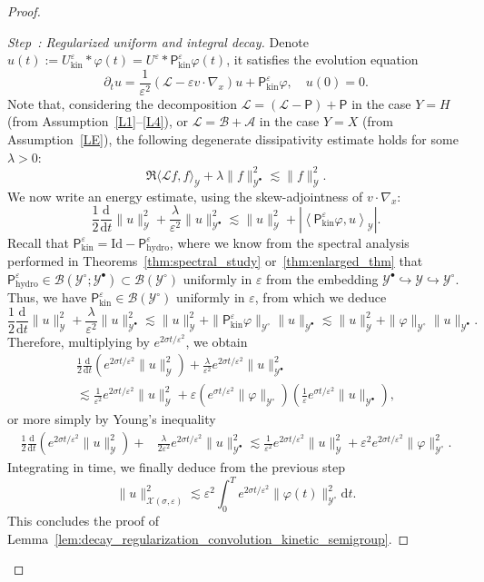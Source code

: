 \documentclass[AHL,Unicode,longabstracts,published]{cedram}
\newcommand{\hyd}{\mathrm{hydro}}
\newcommand{\kin}{\mathrm{kin}}
\newcommand{\Id}{\mathrm{Id}}
\renewcommand{\d}{\mathrm{d}}
\renewcommand{\AA}{\mathcal{A}}
\newcommand{\BB}{\mathcal{B}}
\newcommand{\LL}{\mathcal{L}}
\newcommand{\PP}{\mathsf{P}}
\newcommand{\VV}{\mathcal{Y}}
\newcommand{\BBB}{\mathscr{B}}
\newcommand{\GGG}{\mathscr{X}}
\newcommand{\Ss}{H}
\newcommand{\Sl}{X}
\newcommand{\SSSl}{\GGG}
\newcommand{\Sg}{Y}
\newcommand{\SSg}{\VV}
\newcommand{\SSgp}{\VV^{\bullet}}
\newcommand{\SSgm}{\VV^{\circ}}
\newcommand*\eps{{\varepsilon}}
\newcommand{\la}{\langle}
\newcommand{\ra}{\rangle}
\newcommand{\lla}{\left\langle}
\newcommand{\rra}{\right\rangle}
\newcounter{stepcount}
\newenvironment{step}[1]{\refstepcounter{stepcount}\begin{proof}[Step~\thestepcount: #1]}{\let\qed\relax\end{proof}}
\begin{document}
\begin{proof}
\begin{step}{{Regularized uniform and integral decay}}\label{prflemm4.9step2}
Denote $u(t) := U^\eps_\kin * \varphi(t) = U^\eps * \PP^\eps_\kin \varphi(t)$, it satisfies the evolution equation
\[
\partial_t u = \frac{1}{\eps^2} \left(\LL - \eps v \cdot \nabla_x \right) u + \PP^\eps_\kin \varphi, \quad u(0) = 0.
\]
Note that, considering the decomposition $\LL = (\LL - \PP) + \PP$ in the case $\Sg = \Ss$ (from Assumption~\eqref{L1}--\eqref{L4}), or $\LL = \BB+ \AA$ in the case $\Sg = \Sl$ (from Assumption~\eqref{LE}), the following degenerate dissipativity estimate holds for some $\lambda > 0$:
\[
\Re \la \LL f, f \ra_\SSg + \lambda \| f \|_{\SSgp}^2 \lesssim \| f \|^2_\SSg.
\]
We now write an energy estimate, using the skew-adjointness of $v \cdot \nabla_{x}$:
\[
\frac{1}{2} \frac{\d}{\d t} \| u \|^2_{\SSg} + \frac{\lambda}{\eps^2} \| u \|_{\SSgp}^2 \lesssim \| u \|^2_{\SSg} + \left| \lla \PP^\eps_\kin \varphi, u \rra_\SSg \right|.
\]
Recall that $\PP^\eps_\kin = \Id - \PP^\eps_\hyd$, where we know from the spectral analysis performed in Theorems~\ref{thm:spectral_study} or~\ref{thm:enlarged_thm} that $\PP^\eps_\hyd \in \BBB(\SSgm ; \SSgp) \subset \BBB(\SSgm)$ uniformly in $\eps$ from the embedding $\SSgp \hookrightarrow \SSg \hookrightarrow \SSgm$. Thus, we have $\PP^\eps_\kin \in \BBB(\SSgm)$ uniformly in $\eps$, from which we deduce
\[
\frac{1}{2} \frac{\d}{\d t} \| u \|^2_{\SSg} + \frac{\lambda}{\eps^2} \| u \|_{\SSgp}^2 \lesssim \| u \|^2_{\SSg} + \| \PP^\eps_\kin \varphi \|_{\SSgm} \| u \|_{\SSgp} \lesssim \| u \|^2_{\SSg} + \| \varphi \|_{\SSgm} \| u \|_{\SSgp}.
\]
Therefore, multiplying by $e^{2\sigma t / \eps^2}$, we obtain
\begin{multline*}
\frac{1}{2} \frac{\d}{\d t} \left(e^{2 \sigma t / \eps^2} \| u \|^2_{\SSg}\right) +  \frac{\lambda}{\eps^2} e^{2 \sigma t / \eps^2} \| u \|_{\SSgp}^2 \\
 \lesssim \frac{1}{\eps^2} e^{2 \sigma t / \eps^2} \| u \|^2_{\SSg} + \eps \left(e^{\sigma t / \eps^2} \| \varphi \|_{\SSgm}\right) \left(\frac{1}{\eps} e^{\sigma t / \eps^2} \| u \|_{\SSgp}\right),
\end{multline*}
or more simply by Young's inequality
\begin{align*}
\frac{1}{2} \frac{\d}{\d t} \left(e^{2 \sigma t / \eps^2} \| u \|^2_{\SSg}\right) + & \frac{\lambda}{2 \eps^2} e^{2 \sigma t / \eps^2} \| u \|_{\SSgp}^2
\lesssim \frac{1}{\eps^2} e^{2 \sigma t / \eps^2} \| u \|^2_{\SSg} + \eps^2 e^{2 \sigma t / \eps^2} \| \varphi \|_{\SSgm}^2.
\end{align*}
Integrating in time, we finally deduce from the previous step
\[
\| u \|^2_{\SSSl(\sigma, \eps)} \lesssim \eps^2 \int_0^T e^{2 \sigma t / \eps^2} \| \varphi(t) \|_{\SSgm}^2\d t.
\]
This concludes the proof of Lemma~\ref{lem:decay_regularization_convolution_kinetic_semigroup}.\qedhere
\end{step}\let\qed\relax
\end{proof}
\end{document}
